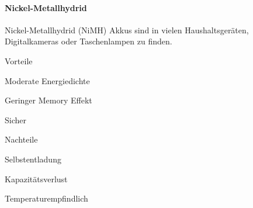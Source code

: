 \documentclass[../main.tex]{subfiles}
\begin{document}
\paragraph{Nickel-Metallhydrid}

Nickel-Metallhydrid (NiMH) Akkus sind in vielen Haushaltsgeräten, Digitalkameras oder Taschenlampen zu finden. 

\begin{minipage}[t]{0.48\textwidth}
\begin{items}
  \item [Vorteile]
  \item Moderate Energiedichte
  \item Geringer Memory Effekt
  \item Sicher
\end{items}
\end{minipage}
\hfill
\begin{minipage}[t]{0.48\textwidth}
\begin{items}
  \item [Nachteile]
  \item Selbstentladung
  \item Kapazitätsverlust
  \item Temperaturempfindlich
\end{items}
\end{minipage}
\end{document}
